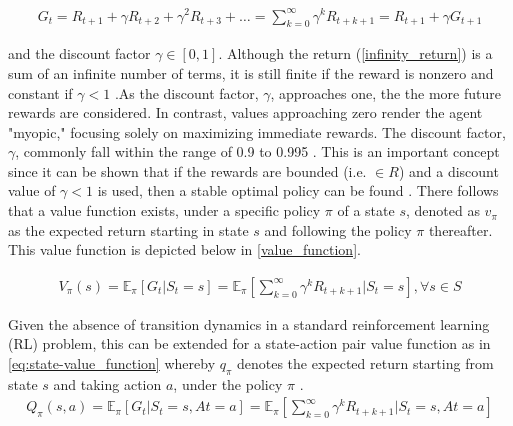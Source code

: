 \begin{equation}
	\begin{aligned}
		G_t  = R_{t+1} + \gamma R_{t+2} + \gamma^2 R_{t+3} + \dots = \sum_{k=0}^\infty \gamma^k R_{t+k+1} = R_{t+1} + \gamma G_{t+1}
	\end{aligned}
	\label{infinity_return}
\end{equation}

and the discount factor $\gamma \in [0,1]$. Although the return (\autoref{infinity_return}) is a sum of an infinite number of terms, it is still finite if the reward is nonzero and constant if $\gamma < 1$ \cite{suttonReinforcementLearningIntroduction2014}.As the discount factor, $\gamma$, approaches one, the the more future rewards are considered.  In contrast, values approaching zero render the agent "myopic," focusing solely on maximizing immediate rewards. The discount factor, $\gamma$, commonly fall within the range of 0.9 to 0.995 \cite{vandenbemdRobustDeepReinforcement}. This is an important concept since it can be shown that if the rewards are bounded (i.e. $\in R$) and a discount value of $\gamma <1$ is used, then a stable optimal policy can be found \cite{bertsekasNewtonMethodReinforcement2022}. There follows that a value function exists, under a specific policy $\pi$ of a state $s$, denoted as $v_{\pi}$ as the expected return starting in state $s$ and following the policy $\pi$ thereafter. This value function is depicted below in \autoref{value_function}.

\begin{equation}
	\begin{aligned}
		V_{\pi}(s) =  \mathbb{E}_{\pi}\left[{G_t | S_t = s}\right] =  \mathbb{E}_{\pi} 
		\left [\sum_{k=0}^{\infty} \gamma^k R_{t+k+1} | S_t = s \right], \forall s \in S 
	\end{aligned}
	\label{value_function}
\end{equation}

Given the absence of transition dynamics in a standard reinforcement learning (RL) problem, this can be extended for a state-action pair value function as in \autoref{eq:state-value_function} whereby $q_{\pi}$ denotes the expected return starting from state $s$ and taking action $a$, under the policy $\pi$ \cite{ajagekarDeepReinforcementLearning2022}.
\begin{equation}
	\begin{aligned}
		Q_{\pi}(s,a) =  \mathbb{E}_{\pi}\left[{G_t | S_t = s, At = a}\right] =  \mathbb{E}_{\pi}\left[\sum_{k=0}^{\infty} \gamma^k R_{t+k+1} | S_t = s, At = a\right]
	\end{aligned}
	\label{eq:state-value_function}
\end{equation}


